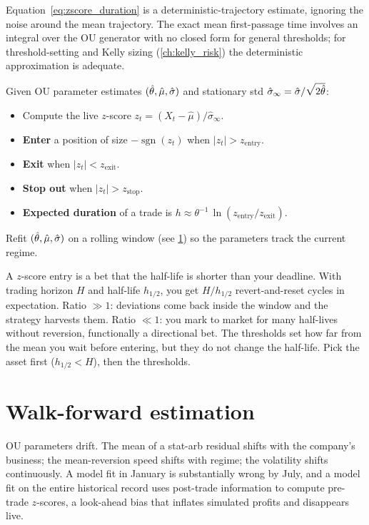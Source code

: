 Equation~\eqref{eq:zscore_duration} is a
deterministic-trajectory estimate, ignoring the noise around the
mean trajectory. The exact mean first-passage time involves an
integral over the OU generator with no closed form for general
thresholds; for threshold-setting and Kelly sizing
(\cref{ch:kelly_risk}) the deterministic approximation is
adequate.

\begin{keyfactbox}
Given OU parameter estimates $(\hat\theta, \hat\mu, \hat{\sigma})$
and stationary std $\hat\sigma_\infty = \hat{\sigma}/\sqrt{2\hat\theta}$:
\begin{itemize}
  \item Compute the live $z$-score
  $z_t = (X_t - \hat\mu)/\hat\sigma_\infty$.
  \item \textbf{Enter} a position of size
  $-\operatorname{sgn}(z_t)$ when $|z_t| > z_{\text{entry}}$.
  \item \textbf{Exit} when $|z_t| < z_{\text{exit}}$.
  \item \textbf{Stop out} when $|z_t| > z_{\text{stop}}$.
  \item \textbf{Expected duration} of a trade is
  $h \approx \theta^{-1}\,\ln(z_{\text{entry}}/z_{\text{exit}})$.
\end{itemize}
Refit $(\hat\theta, \hat\mu, \hat{\sigma})$ on a rolling window
(see \cref{sec:ch9_walkforward}) so the parameters track the
current regime.
\end{keyfactbox}

\begin{intuitionbox}
A $z$-score entry is a bet that the half-life is shorter than
your deadline. With trading horizon $H$ and half-life $h_{1/2}$,
you get $H/h_{1/2}$ revert-and-reset cycles in expectation. Ratio
$\gg 1$: deviations come back inside the window and the strategy
harvests them. Ratio $\ll 1$: you mark to market for many
half-lives without reversion, functionally a directional bet.
The thresholds set how far from the mean you wait before
entering, but they do not change the half-life. Pick the asset
first ($h_{1/2} < H$), then the thresholds.
\end{intuitionbox}

\section{Walk-forward estimation}
\label{sec:ch9_walkforward}

OU parameters drift. The mean of a stat-arb residual shifts with
the company's business; the mean-reversion speed shifts with
regime; the volatility shifts continuously. A model fit in
January is substantially wrong by July, and a model fit on the
entire historical record uses post-trade information to compute
pre-trade $z$-scores, a look-ahead bias that inflates simulated
profits and disappears live.

